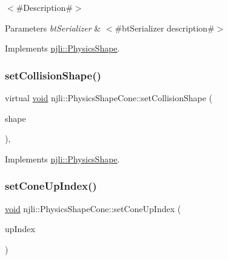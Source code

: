 $<$\#\+Description\#$>$


\begin{DoxyParams}{Parameters}
{\em bt\+Serializer} & $<$\#bt\+Serializer description\#$>$ \\
\hline
\end{DoxyParams}


Implements \mbox{\hyperlink{classnjli_1_1_physics_shape_a2ac8a109a5ad67ee79f40ce8f28337cf}{njli\+::\+Physics\+Shape}}.

\mbox{\label{classnjli_1_1_physics_shape_cone_a9d1a22e39d9a3b70646df7ff58bd46c0}} 
\subsubsection{\texorpdfstring{set\+Collision\+Shape()}{setCollisionShape()}}
{\footnotesize\ttfamily virtual \mbox{\hyperlink{_thread_8h_af1e856da2e658414cb2456cb6f7ebc66}{void}} njli\+::\+Physics\+Shape\+Cone\+::set\+Collision\+Shape (\begin{DoxyParamCaption}\item[{const bt\+Collision\+Shape \&}]{shape }\end{DoxyParamCaption})\hspace{0.3cm}{\ttfamily [protected]}, {\ttfamily [virtual]}}



Implements \mbox{\hyperlink{classnjli_1_1_physics_shape_a441e82a42f3b588a409c3b6c41288abd}{njli\+::\+Physics\+Shape}}.

\mbox{\label{classnjli_1_1_physics_shape_cone_a411e6e50e05af10e3d4c71e8240775b5}} 
\subsubsection{\texorpdfstring{set\+Cone\+Up\+Index()}{setConeUpIndex()}}
{\footnotesize\ttfamily \mbox{\hyperlink{_thread_8h_af1e856da2e658414cb2456cb6f7ebc66}{void}} njli\+::\+Physics\+Shape\+Cone\+::set\+Cone\+Up\+Index (\begin{DoxyParamCaption}\item[{int}]{up\+Index }\end{DoxyParamCaption})}

